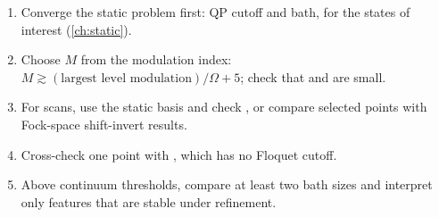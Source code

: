 \begin{enumerate}
\item Converge the static problem first: QP cutoff and bath, for the states of interest
(\cref{ch:static}).
\item Choose $M$ from the modulation index: $M\gtrsim(\text{largest level modulation})/\Omega+5$;
check that  and  are small.
\item For scans, use the static basis and check , or compare selected
points with Fock-space shift-invert results.
\item Cross-check one point with , which has no Floquet cutoff.
\item Above continuum thresholds, compare at least two bath sizes and interpret only
features that are stable under refinement.
\end{enumerate}

